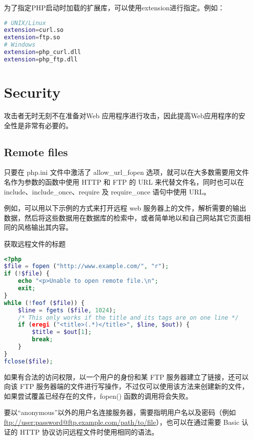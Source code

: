 为了指定PHP启动时加载的扩展库，可以使用extension进行指定。例如：

\begin{lstlisting}[language=bash]
# UNIX/Linux
extension=curl.so
extension=ftp.so
# Windows
extension=php_curl.dll
extension=php_ftp.dll
\end{lstlisting}



\chapter{Security}

攻击者无时无刻不在准备对Web 应用程序进行攻击，因此提高Web应用程序的安全性是非常有必要的。


\section{Remote files}

只要在 php.ini 文件中激活了 allow\_url\_fopen 选项，就可以在大多数需要用文件名作为参数的函数中使用 HTTP 和 FTP 的 URL 来代替文件名，同时也可以在 include、include\_once、require 及 require\_once 语句中使用 URL。

例如，可以用以下示例的方式来打开远程 web 服务器上的文件，解析需要的输出数据，然后将这些数据用在数据库的检索中，或者简单地以和自己网站其它页面相同的风格输出其内容。


\begin{example}
获取远程文件的标题
\begin{lstlisting}[language=PHP]
<?php
$file = fopen ("http://www.example.com/", "r");
if (!$file) {
    echo "<p>Unable to open remote file.\n";
    exit;
}
while (!feof ($file)) {
    $line = fgets ($file, 1024);
    /* This only works if the title and its tags are on one line */
    if (eregi ("<title>(.*)</title>", $line, $out)) {
        $title = $out[1];
        break;
    }
}
fclose($file);
\end{lstlisting}
\end{example}

如果有合法的访问权限，以一个用户的身份和某 FTP 服务器建立了链接，还可以向该 FTP 服务器端的文件进行写操作，不过仅可以使用该方法来创建新的文件，如果尝试覆盖已经存在的文件，fopen() 函数的调用将会失败。

要以“anonymous”以外的用户名连接服务器，需要指明用户名以及密码（例如\url{ftp://user:password@ftp.example.com/path/to/file}），也可以在通过需要 Basic 认证的 HTTP 协议访问远程文件时使用相同的语法。


